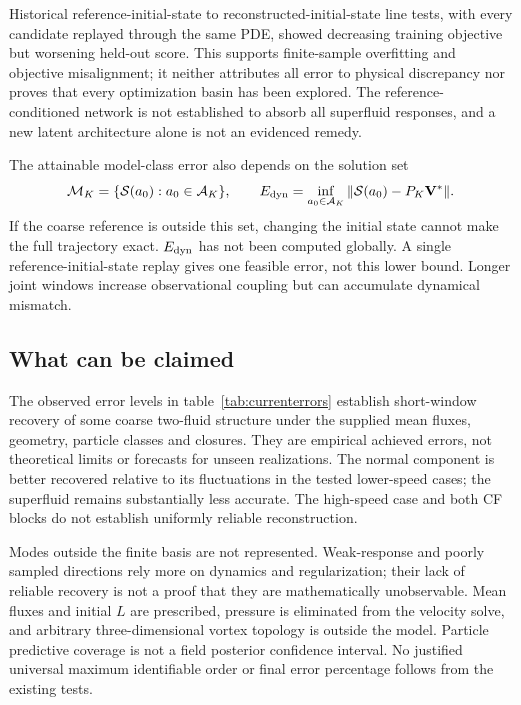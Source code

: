 \documentclass[11pt]{article}
\numberwithin{equation}{section}
\begin{document}
Historical reference-initial-state to reconstructed-initial-state line tests, with every candidate replayed through the same PDE, showed decreasing training objective but worsening held-out score. This supports finite-sample overfitting and objective misalignment; it neither attributes all error to physical discrepancy nor proves that every optimization basin has been explored. The reference-conditioned network is not established to absorb all superfluid responses, and a new latent architecture alone is not an evidenced remedy.

The attainable model-class error also depends on the solution set
\begin{equation}
 \mathcal M_K=\{\mathcal S(a_0):a_0\in\mathcal A_K\},\qquad
 E_{\rm dyn}=\inf_{a_0\in\mathcal A_K}
       \|\mathcal S(a_0)-P_K\mathbf V^*\|.
 \label{eq:dynamicfloor}
\end{equation}
If the coarse reference is outside this set, changing the initial state cannot make the full trajectory exact. $E_{\rm dyn}$ has not been computed globally. A single reference-initial-state replay gives one feasible error, not this lower bound. Longer joint windows increase observational coupling but can accumulate dynamical mismatch.

\subsection{What can be claimed}

The observed error levels in table~\ref{tab:currenterrors} establish short-window recovery of some coarse two-fluid structure under the supplied mean fluxes, geometry, particle classes and closures. They are empirical achieved errors, not theoretical limits or forecasts for unseen realizations. The normal component is better recovered relative to its fluctuations in the tested lower-speed cases; the superfluid remains substantially less accurate. The high-speed case and both CF blocks do not establish uniformly reliable reconstruction.

Modes outside the finite basis are not represented. Weak-response and poorly sampled directions rely more on dynamics and regularization; their lack of reliable recovery is not a proof that they are mathematically unobservable. Mean fluxes and initial $L$ are prescribed, pressure is eliminated from the velocity solve, and arbitrary three-dimensional vortex topology is outside the model. Particle predictive coverage is not a field posterior confidence interval. No justified universal maximum identifiable order or final error percentage follows from the existing tests.
\end{document}
